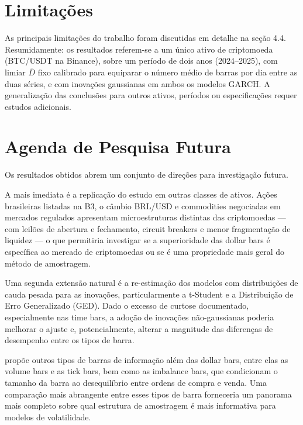 \section{Limitações}
\label{sec:limitacoes_conclusao}

As principais limitações do trabalho foram discutidas em detalhe na seção 4.4.
Resumidamente: os resultados referem-se a um único ativo de criptomoeda (BTC/USDT na
Binance), sobre um período de dois anos (2024–2025), com limiar $\bar{D}$ fixo calibrado
para equiparar o número médio de barras por dia entre as duas séries, e com inovações
gaussianas em ambos os modelos GARCH. A generalização das conclusões para outros ativos,
períodos ou especificações requer estudos adicionais.

\section{Agenda de Pesquisa Futura}
\label{sec:agenda_futura}

Os resultados obtidos abrem um conjunto de direções para investigação futura.

A mais imediata é a replicação do estudo em outras classes de ativos. Ações brasileiras
listadas na B3, o câmbio BRL/USD e commodities negociadas em mercados regulados apresentam
microestruturas distintas das criptomoedas — com leilões de abertura e fechamento,
circuit breakers e menor fragmentação de liquidez — o que permitiria investigar se a
superioridade das dollar bars é específica ao mercado de criptomoedas ou se é uma
propriedade mais geral do método de amostragem.

Uma segunda extensão natural é a re-estimação dos modelos com distribuições de cauda pesada
para as inovações, particularmente a t-Student e a Distribuição de Erro Generalizado (GED).
Dado o excesso de curtose documentado, especialmente nas time bars, a adoção de inovações
não-gaussianas poderia melhorar o ajuste e, potencialmente, alterar a magnitude das
diferenças de desempenho entre os tipos de barra.

 propõe outros tipos de barras de informação além das dollar bars,
entre elas as volume bars e as tick bars, bem como as imbalance bars, que condicionam o
tamanho da barra ao desequilíbrio entre ordens de compra e venda. Uma comparação mais
abrangente entre esses tipos de barra forneceria um panorama mais completo sobre qual
estrutura de amostragem é mais informativa para modelos de volatilidade.

